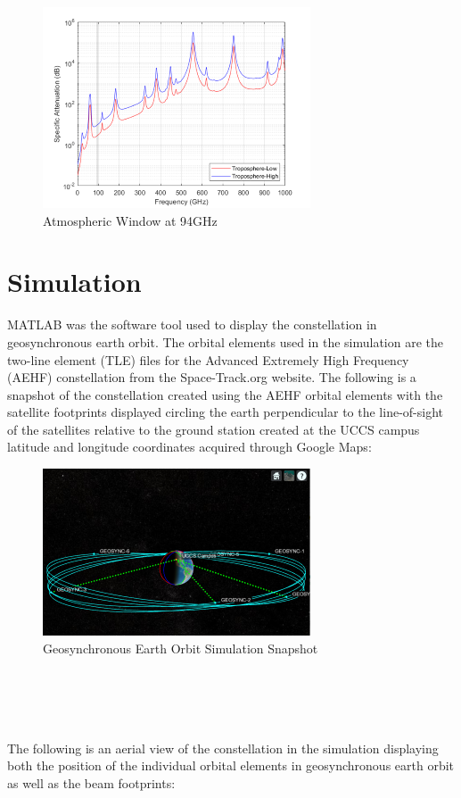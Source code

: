 \documentclass[conference]{IEEEtran}
\begin{document}
\begin{figure}[h]
\centerline{\includegraphics{copyMATLAB300x225.png}}
\caption{Atmospheric Window at 94GHz}
\label{fig:2}
\end{figure}

\section{Simulation}
MATLAB was the software tool used to display the constellation in geosynchronous earth orbit. The orbital elements used in the simulation are the two-line element (TLE) files for the Advanced Extremely High Frequency (AEHF) constellation from the Space-Track.org website. The following is a snapshot of the constellation created using the AEHF orbital elements with the satellite footprints displayed circling the earth perpendicular to the line-of-sight of the satellites relative to the ground station created at the UCCS campus latitude and longitude coordinates acquired through Google Maps:
\begin{figure}[h]
\centerline{\includegraphics{constellation1copy.png}}
\caption{Geosynchronous Earth Orbit Simulation Snapshot}
\label{fig:3}
\end{figure}
\\\\\\\\The following is an aerial view of the constellation in the simulation displaying both the position of the individual orbital elements in geosynchronous earth orbit as well as the beam footprints:
\end{document}

